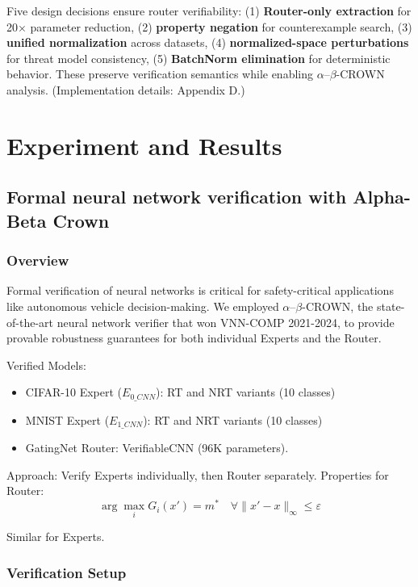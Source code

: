 \documentclass[11pt,a4paper]{article}
\begin{document}
Five design decisions ensure router verifiability: (1) \textbf{Router-only extraction} for 20$\times$ parameter reduction, (2) \textbf{property negation} for counterexample search, (3) \textbf{unified normalization} across datasets, (4) \textbf{normalized-space perturbations} for threat model consistency, (5) \textbf{BatchNorm elimination} for deterministic behavior. These preserve verification semantics while enabling $\alpha$--$\beta$-CROWN analysis. (Implementation details: Appendix D.)

\section{Experiment and Results}

\subsection{Formal neural network verification with Alpha-Beta Crown}

\subsubsection{Overview}

Formal verification of neural networks is critical for safety-critical applications like autonomous vehicle decision-making. We employed $\alpha$--$\beta$-CROWN, the state-of-the-art neural network verifier that won VNN-COMP 2021-2024, to provide provable robustness guarantees for both individual Experts and the Router.

Verified Models:
\begin{itemize}
    \item CIFAR-10 Expert ($E_{0\_CNN}$): RT and NRT variants (10 classes)
    \item MNIST Expert ($E_{1\_CNN}$): RT and NRT variants (10 classes)
    \item GatingNet Router: VerifiableCNN (96K parameters).
\end{itemize}

Approach: Verify Experts individually, then Router separately. Properties for Router:
\begin{equation}
    \arg\max_i G_i(x') = m^* \quad \forall \|x' - x\|_\infty \leq \varepsilon
\end{equation}

Similar for Experts.

\subsubsection{Verification Setup}
\end{document}
